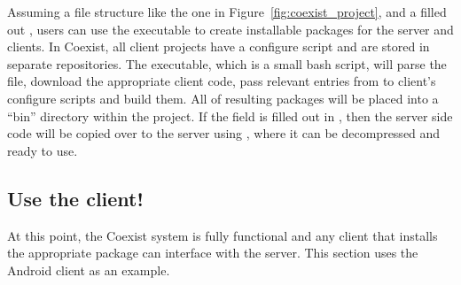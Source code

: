 Assuming a file structure like the one in Figure~\ref{fig:coexist_project}, and
a filled out , users can use the  executable to
create installable packages for the server and clients. In Coexist, all client
projects have a configure script and are stored in separate repositories. The
 executable, which is a small bash script, will parse the
 file, download the appropriate client code, pass relevant
entries from  to client's configure scripts and build them.
All of resulting packages will be placed into a ``bin'' directory within the
project. If the  field is filled out in , then the
server side code will be copied over to the server using , where it can
be decompressed and ready to use.






\subsection{Use the client!}  \label{sec:}

At this point, the Coexist system is fully functional and any client that
installs the appropriate package can interface with the server. This section uses the
Android client as an example.


